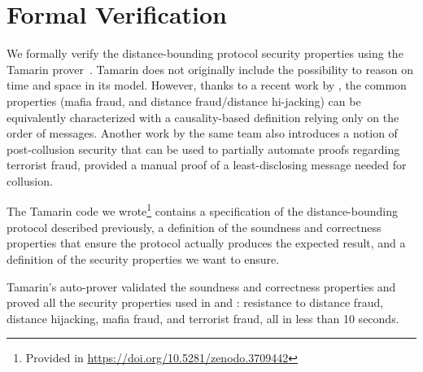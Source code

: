 \section{Formal Verification}\label{formal-verification}

We formally verify the distance-bounding protocol security properties using the Tamarin
prover~\cite{meier2013tamarin}. Tamarin does not originally include
the possibility to reason on time and space in its model.  However,
thanks to a recent work by \textcite{TamarinDB}, the common properties
(mafia fraud, and distance fraud/distance hi-jacking) can be equivalently 
characterized with a causality-based definition relying only on the order
of messages.
Another work by the same team \textcite{TamarinDBTF} also introduces a
notion of post-collusion security that can be used to partially automate
proofs regarding terrorist fraud, provided a manual proof of a least-disclosing
message needed for collusion.


The Tamarin code we wrote\footnote{Provided in \url{https://doi.org/10.5281/zenodo.3709442}}%
 contains a specification of the distance-bounding protocol described previously, a definition 
 of the soundness and correctness properties that ensure the protocol actually produces the
 expected result, and a definition of the security properties we want to ensure.

Tamarin's auto-prover validated the soundness and correctness
properties and proved all the security
properties used in \cite{TamarinDB} and \cite{TamarinDBTF}: resistance to 
distance fraud, distance hijacking, mafia fraud, and terrorist fraud, all in 
less than 10 seconds.

